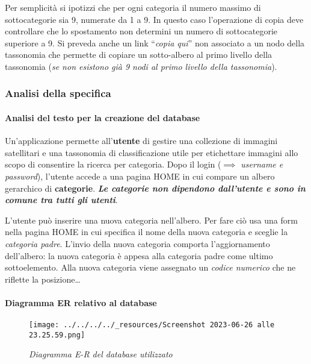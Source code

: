 Per semplicità si ipotizzi che per ogni categoria il numero massimo di
sottocategorie sia 9, numerate da 1 a 9. In questo caso l'operazione di
copia deve controllare che lo spostamento non determini un numero di
sottocategorie superiore a 9. Si preveda anche un link ``\emph{copia
qui}'' non associato a un nodo della tassonomia che permette di copiare
un sotto-albero al primo livello della tassonomia (\emph{se non esistono
già 9 nodi al primo livello della tassonomia}).

\hypertarget{analisi-della-specifica}{%
\subsubsection{Analisi della specifica}\label{analisi-della-specifica}}

\hypertarget{analisi-del-testo-per-la-creazione-del-database}{%
\paragraph{Analisi del testo per la creazione del
database}\label{analisi-del-testo-per-la-creazione-del-database}}

Un'applicazione permette all'\textbf{utente} di gestire una collezione
di immagini satellitari e una tassonomia di classificazione utile per
etichettare immagini allo scopo di consentire la ricerca per categoria.
Dopo il login (\(\implies\) \emph{username e password}), l'utente accede
a una pagina HOME in cui compare un albero gerarchico di
\textbf{categorie}. \textbf{\emph{Le categorie non dipendono dall'utente
e sono in comune tra tutti gli utenti}}.

L'utente può inserire una nuova categoria nell'albero. Per fare ciò usa
una form nella pagina HOME in cui specifica il nome della nuova
categoria e sceglie la \emph{categoria padre}. L'invio della nuova
categoria comporta l'aggiornamento dell'albero: la nuova categoria è
appesa alla categoria padre come ultimo sottoelemento. Alla nuova
categoria viene assegnato un \emph{codice numerico} che ne riflette la
posizione\ldots{}

\hypertarget{diagramma-er-relativo-al-database}{%
\paragraph{Diagramma ER relativo al
database}\label{diagramma-er-relativo-al-database}}

\begin{figure}
\centering
\texttt{[image: ../../../../\_resources/Screenshot 2023-06-26 alle 23.25.59.png]}
\caption{\emph{Diagramma E-R del database utilizzato}}
\end{figure}

